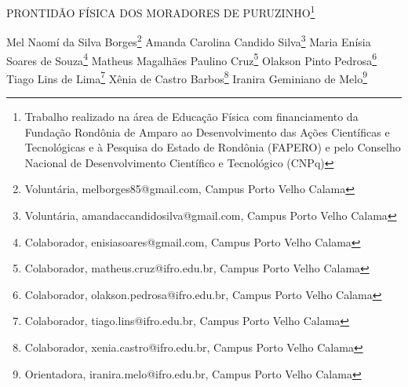 \documentclass[article,12pt,onesidea,4paper,english,brazil]{abntex2}
\begin{document}
	
	
	\frenchspacing 
	
	\begin{center}
		\LARGE PRONTIDÃO FÍSICA DOS MORADORES DE PURUZINHO\footnote{Trabalho realizado na área de Educação Física com financiamento da Fundação Rondônia de Amparo ao
			Desenvolvimento das Ações Científicas e Tecnológicas e à Pesquisa do Estado de Rondônia (FAPERO) e pelo
			Conselho Nacional de Desenvolvimento Científico e Tecnológico (CNPq)}
		
		\normalsize
		Mel Naomí da Silva Borges\footnote{Voluntária, melborges85@gmail.com, Campus Porto Velho Calama} 
		Amanda Carolina Candido Silva\footnote{Voluntária, amandaccandidosilva@gmail.com, Campus Porto Velho Calama} 
		Maria Enísia Soares de Souza\footnote{Colaborador, enisiasoares@gmail.com, Campus Porto Velho Calama} 
		Matheus Magalhães Paulino Cruz\footnote{Colaborador, matheus.cruz@ifro.edu.br, Campus Porto Velho Calama}
		Olakson Pinto Pedrosa\footnote{Colaborador, olakson.pedrosa@ifro.edu.br, Campus Porto Velho Calama}
		Tiago Lins de Lima\footnote{Colaborador, tiago.lins@ifro.edu.br, Campus Porto Velho Calama}
		Xênia de Castro Barbos\footnote{Colaborador, xenia.castro@ifro.edu.br, Campus Porto Velho Calama}
        Iranira Geminiano de Melo\footnote{Orientadora, iranira.melo@ifro.edu.br, Campus Porto Velho Calama}		
		 
	\end{center}
	
\end{document}
